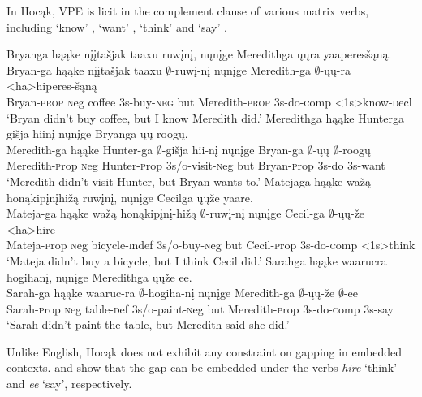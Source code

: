 \documentclass[output=paper]{LSP/langsci}
\begin{document}
In Hocąk, VPE is licit in the complement clause of various matrix verbs, including `know' , `want' , `think'  and `say' .


 
\ea
\ea\label{ex:johnson:38a} 
\glll Bryanga hąąke {nįįtašjak taaxu} ruwįnį, nųnįge Meredithga ųųra yaaperesšąną.\\
Bryan-ga hąąke {nįįtašjak taaxu} $\emptyset$-ruwį-nį nųnįge Meredith-ga $\emptyset$-ųų-ra <ha>hiperes-šąną\\
Bryan-\textsc{prop} {\textsc neg} coffee {\textsc 3s}-buy-\textsc{neg} but Meredith-\textsc{prop} {\textsc 3s}-do-{\textsc comp} <{\textsc 1s}>know-{\textsc decl}\\
\trans `Bryan didn't buy coffee, but I know Meredith did.'
\ex\label{ex:johnson:38b}
\glll Meredithga hąąke Hunterga {gišja hiinį} nųnįge Bryanga ųų roogų.\\
Meredith-ga hąąke Hunter-ga $\emptyset$-{gišja hii-nį} nųnįge Bryan-ga $\emptyset$-ųų $\emptyset$-roogų\\
Meredith-{\textsc prop} {\textsc neg} Hunter-{\textsc prop} {\textsc 3s/o}-visit-{\textsc neg} but Bryan-{\textsc prop} {\textsc 3s}-do {\textsc 3s}-want\\
\trans `Meredith didn't visit Hunter, but Bryan wants to.'
\ex\label{ex:johnson:38c}
\glll Matejaga hąąke {wažą honąkipįnįhižą} ruwįnį, nųnįge Cecilga ųųže yaare.\\
Mateja-ga hąąke {wažą honąkipįnį-hižą} $\emptyset$-ruwį-nį nųnįge Cecil-ga $\emptyset$-ųų-že <ha>hire\\
Mateja-{\textsc prop} {\textsc neg} bicycle-{\textsc indef} {\textsc 3s/o}-buy-{\textsc neg} but Cecil-{\textsc prop} {\textsc 3s}-do-{\textsc comp} <{\textsc 1s}>think\\
\trans `Mateja didn't buy a bicycle, but I think Cecil did.'
\ex\label{ex:johnson:38d}
\glll Sarahga hąąke waarucra hogihanį, nųnįge Meredithga ųųže ee.\\
Sarah-ga hąąke waaruc-ra $\emptyset$-hogiha-nį nųnįge Meredith-ga $\emptyset$-ųų-že $\emptyset$-ee\\
Sarah-{\textsc prop} {\textsc neg} table-{\textsc def} {\textsc 3s/o}-paint-{\textsc neg} but Meredith-{\textsc prop} {\textsc 3s}-do-{\textsc comp} {\textsc 3s}-say\\
\trans `Sarah didn't paint the table, but Meredith said she did.'
\z
\z

Unlike English, Hocąk does not exhibit any constraint on gapping in embedded contexts.  and  show that the gap can be embedded under the verbs \emph{hire} `think' and \emph{ee} `say', respectively.
\end{document}
